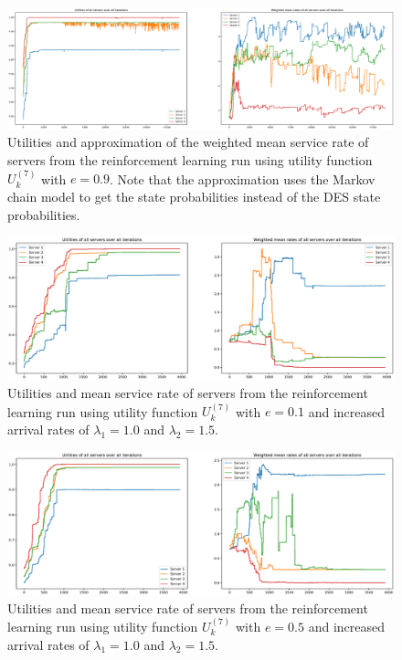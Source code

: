 \begin{figure}[H]
    \includegraphics[width=\textwidth]{chapters/00_appendix/03_more_rl_results/Bin/utility_7_eps/u7_3_e09_markov.eps}
    \caption{Utilities and approximation of the weighted mean service rate of
    servers from the reinforcement learning run using utility function
    \(U_k^{(7)}\) with \(e = 0.9\). Note that the approximation uses the Markov
    chain model to get the state probabilities instead of the DES state
    probabilities.}
    \label{fig:RL_utility7_3_e09_markov}
\end{figure}


\begin{figure}[H]
    \includegraphics[width=\textwidth]{chapters/00_appendix/03_more_rl_results/Bin/utility_7_eps/u7_4_e01_Lambda_25.eps}
    \caption{Utilities and mean service rate of servers from the reinforcement
    learning run using utility function \(U_k^{(7)}\) with \(e = 0.1\) and
    increased arrival rates of \(\lambda_1 = 1.0\) and \(\lambda_2 = 1.5\).}
    \label{fig:RL_utility7_4_e01_Lambda_25}
\end{figure}

\begin{figure}[H]
    \includegraphics[width=\textwidth]{chapters/00_appendix/03_more_rl_results/Bin/utility_7_eps/u7_4_e05_Lambda_25.eps}
    \caption{Utilities and mean service rate of servers from the reinforcement
    learning run using utility function \(U_k^{(7)}\) with \(e = 0.5\) and
    increased arrival rates of \(\lambda_1 = 1.0\) and \(\lambda_2 = 1.5\).}
    \label{fig:RL_utility7_4_e05_Lambda_25}
\end{figure}

